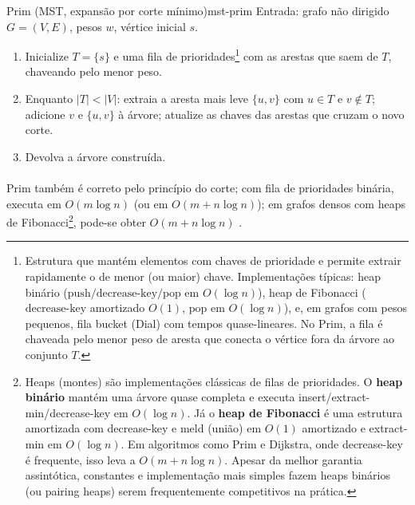\documentclass[12pt,a4paper]{article}
\def\texttt#1{#1}%
\def\emph#1{#1}%
\begin{document}
\begin{algobox}{Prim (MST, expansão por corte mínimo)}{mst-prim}
Entrada: grafo não dirigido \(G=(V,E)\), pesos \(w\), vértice inicial \(s\).
\begin{enumerate}\setlength{\itemsep}{2pt}
    \item Inicialize \(T=\{s\}\) e uma fila de prioridades\footnote{Estrutura que mantém elementos com chaves de prioridade e permite extrair rapidamente o de menor (ou maior) chave. Implementações típicas: \emph{heap} binário (\(\mathrm{push}/\mathrm{decrease\text{-}key}/\mathrm{pop}\) em \(O(\log n)\)), \emph{heap} de Fibonacci (\(\mathrm{decrease\text{-}key}\) amortizado \(O(1)\), \(\mathrm{pop}\) em \(O(\log n)\)), e, em grafos com pesos pequenos, fila bucket (Dial) com tempos quase-lineares. No Prim, a fila é chaveada pelo menor peso de aresta que conecta o vértice fora da árvore ao conjunto \(T\).} com as arestas que saem de \(T\), chaveando pelo menor peso.
    \item Enquanto \(|T|<|V|\): extraia a aresta mais leve \(\{u,v\}\) com \(u\in T\) e \(v\notin T\); adicione \(v\) e \(\{u,v\}\) à árvore; atualize as chaves das arestas que cruzam o novo corte.
    \item Devolva a árvore construída.
\end{enumerate}
\end{algobox}

\paragraph{}Prim também é correto pelo princípio do corte; com fila de prioridades binária, executa em \(O(m\log n)\) (ou em \(O(m+n\log n)\)); em grafos densos com \emph{heaps} de Fibonacci\footnote{\emph{Heaps} (montes) são implementações clássicas de filas de prioridades. O \textbf{heap binário} mantém uma árvore quase completa e executa \texttt{insert}/\texttt{extract-min}/\texttt{decrease-key} em \(O(\log n)\). Já o \textbf{heap de Fibonacci} é uma estrutura amortizada com \texttt{decrease-key} e \texttt{meld} (união) em \(O(1)\) amortizado e \texttt{extract-min} em \(O(\log n)\). Em algoritmos como Prim e Dijkstra, onde \texttt{decrease-key} é frequente, isso leva a \(O(m+n\log n)\). Apesar da melhor garantia assintótica, constantes e implementação mais simples fazem heaps binários (ou \emph{pairing heaps}) serem frequentemente competitivos na prática.}, pode-se obter \(O(m+n\log n)\) \cite{cormen2009,kleinberg2006,west2001introduction,diestel2017graph}.
\end{document}
